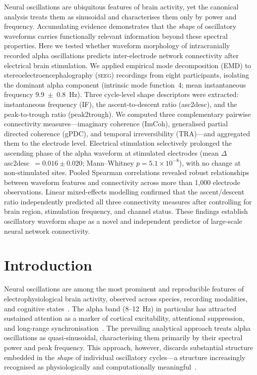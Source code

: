 \documentclass[11pt, a4paper]{article}
\newcommand{\seeg}{\textsc{seeg}}
\newcommand{\asc}{asc2desc}
\newcommand{\ptr}{peak2trough}
\begin{document}
Neural oscillations are ubiquitous features of brain activity, yet the
canonical analysis treats them as sinusoidal and characterises them only by
power and frequency. Accumulating evidence demonstrates that the \emph{shape}
of oscillatory waveforms carries functionally relevant information beyond these
spectral properties. Here we tested whether waveform morphology of
intracranially recorded alpha oscillations predicts inter-electrode network
connectivity after electrical brain stimulation. We applied empirical mode
decomposition (EMD) to stereoelectroencephalography (\seeg) recordings from
eight participants, isolating the dominant alpha component (intrinsic mode
function~4; mean instantaneous frequency 9.9~$\pm$~0.8~Hz). Three cycle-level
shape descriptors were extracted: instantaneous frequency (IF), the
ascent-to-descent ratio (\asc), and the peak-to-trough ratio (\ptr). We
computed three complementary pairwise connectivity measures---imaginary coherence
(ImCoh), generalised partial directed coherence (gPDC), and temporal
irreversibility (TRA)---and aggregated them to the electrode level. Electrical
stimulation selectively prolonged the ascending phase of the alpha waveform at
stimulated electrodes (mean $\Delta$\asc~$= 0.016 \pm 0.020$;
Mann--Whitney $p = 5.1 \times 10^{-8}$), with no change at non-stimulated sites.
Pooled Spearman correlations revealed robust relationships between waveform
features and connectivity across more than 1,000 electrode observations. Linear
mixed-effects modelling confirmed that the ascent/descent ratio independently
predicted all three connectivity measures after controlling for brain region,
stimulation frequency, and channel status. These findings establish oscillatory
waveform shape as a novel and independent predictor of large-scale neural
network connectivity.

\newpage
\section{Introduction}

Neural oscillations are among the most prominent and reproducible features of
electrophysiological brain activity, observed across species, recording
modalities, and cognitive states~\citep{buzsaki2004neuronal, jensen2007human,
fries2015rhythms}. The alpha band (8--12~Hz) in particular has attracted
sustained attention as a marker of cortical excitability, attentional
suppression, and long-range synchronisation~\citep{klimesch1999eeg,
jensen2002oscillations, palva2007new}. The prevailing analytical approach treats
alpha oscillations as quasi-sinusoidal, characterising them primarily by their
spectral power and peak frequency. This approach, however, discards substantial
structure embedded in the \emph{shape} of individual oscillatory cycles---a
structure increasingly recognised as physiologically and computationally
meaningful~\citep{cole2017brain, donoghue2022parameterizing}.
\end{document}
